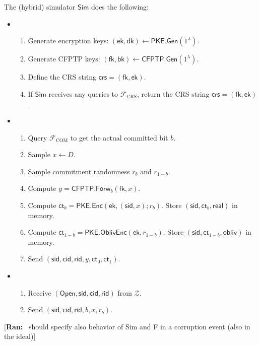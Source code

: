 \documentclass[11pt,letterpaper]{article}
\newcommand{\authnote}[2]{[{\color{red}\textbf{#1:}}~{\color{blue} #2}]}
\newcommand{\authnote}[2]{}
\newcommand{\ran}[1]{\authnote{Ran}{#1}}
\theoremstyle{plain} %
\theoremstyle{definition} %
\theoremstyle{remark} %
\newcommand{\OpenMsg}{\mathsf{Open}}
\newcommand{\real}{\mathsf{real}}
\newcommand{\obliv}{\mathsf{obliv}}
\newcommand{\Input}{x}
\newcommand{\SecParam}{\lambda}
\newcommand{\PKE}{\mathsf{PKE}}
\newcommand{\Gen}{\mathsf{Gen}}
\newcommand{\Enc}{\mathsf{Enc}}
\newcommand{\OblivEnc}{\mathsf{OblivEnc}}
\newcommand{\EncKey}{\mathsf{ek}}
\newcommand{\DecKey}{\mathsf{dk}}
\newcommand{\Ct}{\mathsf{ct}}
\newcommand{\Rand}{r}
\newcommand{\CFPTP}{\mathsf{CFPTP}}
\newcommand{\Forw}{\mathsf{Forw}}
\newcommand{\ForwKey}{\mathsf{fk}}
\newcommand{\BackKey}{\mathsf{bk}}
\newcommand{\Domain}{D}
\newcommand{\Output}{y}
\newcommand{\Simulator}{{\mathsf{Sim}}} %
\newcommand{\Environment}{{\mathcal{Z}}} %
\newcommand{\IF}{\mathcal{F}} %
\newcommand{\sid}{\mathsf{sid}}
\newcommand{\CommitterId}{\mathsf{cid}}
\newcommand{\ReceiverId}{\mathsf{rid}}
\newcommand{\IFCrs}{\IF_{\mathrm{CRS}}}
\newcommand{\crs}{\mathsf{crs}}
\newcommand{\IFCom}{\IF_{\mathrm{COM}}}
\newcommand{\CommBit}{b}
\begin{document}
The (hybrid) simulator $\Simulator$ does the following:
\begin{itemize}
\item \parhead{Simulate $\IFCrs$}
\begin{enumerate}[nolistsep]
    \item Generate encryption keys: $(\EncKey, \DecKey) \gets \PKE.\Gen(1^{\SecParam})$.
    \item Generate CFPTP keys: $(\ForwKey,\BackKey) \gets \CFPTP.\Gen(1^{\SecParam})$.
    \item Define the CRS string $\crs = (\ForwKey, \EncKey)$.
    \item If $\Simulator$ receives any queries to $\IFCrs$, return the CRS string $\crs = (\ForwKey, \EncKey)$.
\end{enumerate}

\item {}
\begin{enumerate}[nolistsep]
    \item Query $\IFCom$ to get the actual committed bit $\CommBit$.
	\item Sample $\Input \gets \Domain$.
	\item Sample commitment randomness $\Rand_{\CommBit}$ and $\Rand_{1-\CommBit}$.
	\item Compute $\Output = \CFPTP.\Forw_{\CommBit}(\ForwKey,\Input)$.
	\item Compute $\Ct_{\CommBit} = \PKE.\Enc(\EncKey, (\sid,\Input); \Rand_\CommBit)$. Store $(\sid,\Ct_{\CommBit},\real)$ in memory.
	\item Compute $\Ct_{1-\CommBit} = \PKE.\OblivEnc(\EncKey, \Rand_{1-\CommBit})$. Store $(\sid,\Ct_{1-\CommBit},\obliv)$ in memory.
	\item Send $(\sid,\CommitterId,\ReceiverId,\Output, \Ct_0, \Ct_1)$.
\end{enumerate}

\item {}
\begin{enumerate}[nolistsep]
\item Receive $(\OpenMsg,\sid,\CommitterId,\ReceiverId)$ from $\Environment$.
\item Send $(\sid,\CommitterId,\ReceiverId,\CommBit, \Input, \Rand_{\CommBit})$.
\end{enumerate}
\end{itemize}

\ran{should specify also behavior of Sim and F in a corruption event   (also  in the ideal)}
\end{document}
